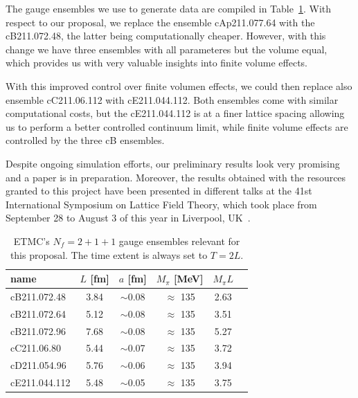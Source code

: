 \documentclass [a4paper, 11pt]{article}
\begin{document}
The gauge ensembles we use to generate data are compiled in Table~\ref{tab:ensembles}.
With respect to our proposal, we replace the ensemble cAp211.077.64
with the cB211.072.48, the latter being computationally
cheaper. However, with this change we have three ensembles with all
parameteres but the volume equal, which provides us with very valuable
insights into finite volume effects.

With this improved control over finite volumen effects, we could then
replace also ensemble cC211.06.112 with cE211.044.112. Both 
ensembles come with similar computational costs, but the cE211.044.112
is at a finer lattice spacing allowing us to perform a better
controlled continuum limit, while finite volume effects are controlled
by the three cB ensembles.

Despite ongoing simulation efforts, our preliminary results
look very promising and a paper is in preparation.  
Moreover, the results obtained with the resources granted to this
project have been presented in different talks at the 41st
International Symposium on Lattice Field Theory, which took place from
September 28 to August 3 of this year in Liverpool, UK~\cite{talklatt2024_ale,talklatt2024_chr}.


\begin{table}[h]
  \centering %
  \begin{tabular}{lccccr} %
    \hline
    name          & $L$ [fm]      & $a$
    [fm]          & $M_\pi$ [MeV] & $M_\pi L$                         \\
    \hline
    \hline
    cB211.072.48  & 3.84          & $\sim$0.08 & $\approx$ 135 & 2.63 \\
    cB211.072.64  & 5.12          & $\sim$0.08 & $\approx$ 135 & 3.51 \\
    cB211.072.96  & 7.68          & $\sim$0.08 & $\approx$ 135 & 5.27 \\
    \hline
    cC211.06.80   & 5.44          & $\sim$0.07 & $\approx$ 135 & 3.72 \\
    \hline
    cD211.054.96  & 5.76          & $\sim$0.06 & $\approx$ 135 & 3.94 \\
    \hline
    cE211.044.112 & 5.48          & $\sim$0.05 & $\approx$ 135 & 3.75 \\
    \hline
  \end{tabular}
  \caption{ETMC's $N_f=2+1+1$ gauge ensembles relevant for this
    proposal. The time extent is always set to $T=2L$.}
  \label{tab:ensembles}
\end{table}
\end{document}
